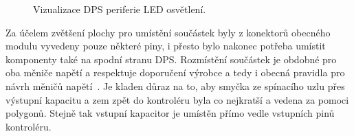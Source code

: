     \begin{figure}[!ht]
        \centering
        \caption{Vizualizace DPS periferie LED osvětlení.}
        \label{fig:perif-led-dps}
    \end{figure}

    Za účelem zvětšení plochy pro umístění součástek byly z konektorů obecného modulu vyvedeny pouze některé piny, i přesto bylo nakonec potřeba umístit komponenty také na spodní stranu DPS. Rozmístění součástek je obdobné pro oba měniče napětí a respektuje doporučení výrobce a tedy i obecná pravidla pro návrh měničů napětí~\cite{Diodes_AP63356Q}. Je kladen důraz na to, aby smyčka ze spínacího uzlu přes výstupní kapacitu a zem zpět do kontroléru byla co nejkratší a vedena za pomoci polygonů. Stejně tak vstupní kapacitor je umístěn přímo vedle vstupních pinů kontroléru.